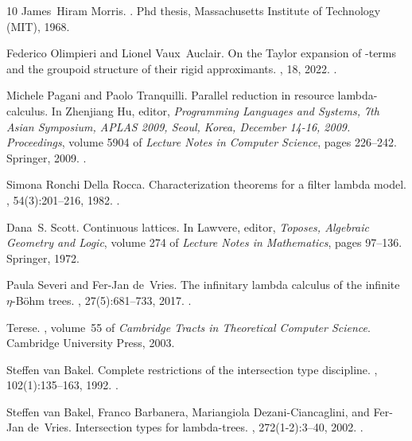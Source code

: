 \documentclass[10pt,a4paper]{amsart}
\theoremstyle{definition}
\begin{document}
\begin{thebibliography}{10}
James~Hiram Morris.
.
\newblock Phd thesis, Massachusetts Institute of Technology (MIT), 1968.

Federico Olimpieri and Lionel Vaux~Auclair.
\newblock On the {T}aylor expansion of \lam-terms and the groupoid structure of
  their rigid approximants.
, 18, 2022.
\newblock \href {https://doi.org/10.46298/lmcs-18(1:1)2022}
  {}.

Michele Pagani and Paolo Tranquilli.
\newblock Parallel reduction in resource lambda-calculus.
\newblock In Zhenjiang Hu, editor, {\em Programming Languages and Systems, 7th
  Asian Symposium, {APLAS} 2009, Seoul, Korea, December 14-16, 2009.
  Proceedings}, volume 5904 of {\em Lecture Notes in Computer Science}, pages
  226--242. Springer, 2009.
\newblock \href {https://doi.org/10.1007/978-3-642-10672-9\_17}
  {}.

Simona {Ronchi Della Rocca}.
\newblock Characterization theorems for a filter lambda model.
, 54(3):201--216, 1982.
\newblock \href {https://doi.org/10.1016/S0019-9958(82)80022-3}
  {}.

Dana~S. Scott.
\newblock Continuous lattices.
\newblock In Lawvere, editor, {\em Toposes, Algebraic Geometry and Logic},
  volume 274 of {\em Lecture Notes in Mathematics}, pages 97--136. Springer,
  1972.

Paula Severi and Fer{-}Jan de~Vries.
\newblock The infinitary lambda calculus of the infinite $\eta$-{B\"{o}}hm
  trees.
, 27(5):681--733, 2017.
\newblock \href {https://doi.org/10.1017/S096012951500033X}
  {}.

Terese.
, volume~55 of {\em Cambridge Tracts in
  Theoretical Computer Science}.
\newblock Cambridge University Press, 2003.

Steffen van Bakel.
\newblock Complete restrictions of the intersection type discipline.
, 102(1):135--163, 1992.
\newblock \href {https://doi.org/10.1016/0304-3975(92)90297-S}
  {}.

Steffen van Bakel, Franco Barbanera, Mariangiola Dezani{-}Ciancaglini, and
  Fer{-}Jan de~Vries.
\newblock Intersection types for lambda-trees.
, 272(1-2):3--40, 2002.
\newblock \href {https://doi.org/10.1016/S0304-3975(00)00346-7}
  {}.


\end{thebibliography}
\end{document}
